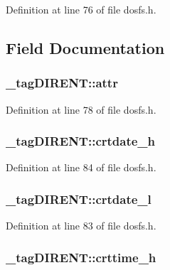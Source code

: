 Definition at line 76 of file dosfs.\-h.



\subsection{Field Documentation}
\hypertarget{struct__tag_d_i_r_e_n_t_aa7b22cac0649dc7d55ba096a9ea5aaa6}{
\subsubsection[{attr}]{ \-\_\-tag\-D\-I\-R\-E\-N\-T\-::attr}}\label{struct__tag_d_i_r_e_n_t_aa7b22cac0649dc7d55ba096a9ea5aaa6}


Definition at line 78 of file dosfs.\-h.

\hypertarget{struct__tag_d_i_r_e_n_t_acc71bf7e94fb51d36539e28d4394eb73}{
\subsubsection[{crtdate\-\_\-h}]{ \-\_\-tag\-D\-I\-R\-E\-N\-T\-::crtdate\-\_\-h}}\label{struct__tag_d_i_r_e_n_t_acc71bf7e94fb51d36539e28d4394eb73}


Definition at line 84 of file dosfs.\-h.

\hypertarget{struct__tag_d_i_r_e_n_t_a1985e56f435569d336f074accca04c60}{
\subsubsection[{crtdate\-\_\-l}]{ \-\_\-tag\-D\-I\-R\-E\-N\-T\-::crtdate\-\_\-l}}\label{struct__tag_d_i_r_e_n_t_a1985e56f435569d336f074accca04c60}


Definition at line 83 of file dosfs.\-h.

\hypertarget{struct__tag_d_i_r_e_n_t_aa34dfc057de0ab0930177e59070a0d57}{
\subsubsection[{crttime\-\_\-h}]{ \-\_\-tag\-D\-I\-R\-E\-N\-T\-::crttime\-\_\-h}}\label{struct__tag_d_i_r_e_n_t_aa34dfc057de0ab0930177e59070a0d57}


